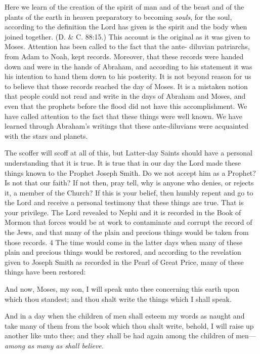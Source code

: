 Here we learn of the creation of the spirit of man and of the beast and of the plants of the
earth in heaven preparatory to becoming \textit{souls}, for the soul, according to the definition the
Lord has given is the spirit and the body when joined together. (D. \& C. 88:15.) This account
is the original as it was given to Moses. Attention has been called to the fact that the ante-
diluvian patriarchs, from Adam to Noah, kept records. Moreover, that these records were
handed down and were in the hands of Abraham, and according to his statement it was his
intention to hand them down to his posterity. It is not beyond reason for us to believe that
those records reached the day of Moses. It is a mistaken notion that people could not read and
write in the days of Abraham and Moses, and even that the prophets before the flood did not
have this accomplishment. We have called attention to the fact that these things were well
known. We have learned through Abraham's writings that these ante-diluvians were
acquainted with the stars and planets.

The scoffer will scoff at all of this, but Latter-day Saints should have a personal
understanding that it is true. It is true that in our day the Lord made these things known to the
Prophet Joseph Smith. Do we not accept him as a Prophet? Is not that our faith? If not then,
pray tell, why is anyone who denies, or rejects it, a member of the Church? If this is your
belief, then humbly repent and go to the Lord and receive a personal testimony that these
things are true. That is your privilege. The Lord revealed to Nephi and it is recorded in the
Book of Mormon that forces would be at work to contaminate and corrupt the record of the
Jews, and that many of the plain and precious things would be taken from those records. 4
The time would come in the latter days when many of these plain and precious things would
be restored, and according to the revelation given to Joseph Smith as recorded in the Pearl of
Great Price, many of these things have been restored:

And now, Moses, my son, I will speak unto thee concerning this earth upon which thou
standest; and thou shalt write the things which I shall speak.

And in a day when the children of men shall esteem my words as naught and take many of
them from the book which thou shalt write, behold, I will raise up another like unto thee; and
they shall be had again among the children of men—\textit{among as many as shall believe.}

